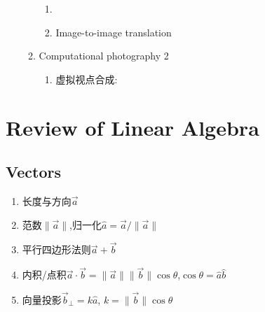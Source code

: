 \begin{enumerate}
\begin{enumerate}
\begin{enumerate}
                \item {}
                \item Image-to-image translation
            \end{enumerate}
            \item Computational photography 2
            \begin{enumerate}
                \item 虚拟视点合成:
            \end{enumerate}
        \end{enumerate}
    \end{enumerate}
    \section{Review of Linear Algebra}
    \subsection{Vectors}
    \begin{enumerate}
        \item 长度与方向$\vec{a}$
        \item 范数$\|\vec{a}\|$,归一化$\hat{a}=\vec{a} /\|\vec{a}\|$
        \item 平行四边形法则$\vec{a}+\vec{b}$
        \item 内积/点积$\vec{a}\cdot \vec{b}=\|\vec{a}\|\|\vec{b}\|\cos\theta$,$\cos\theta = \hat{a}\hat{b}$
        \item 向量投影$\vec{b}_{\perp}=k \hat{a}$, $k=\|\vec{b}\|\cos \theta$
    \end{enumerate}
    
